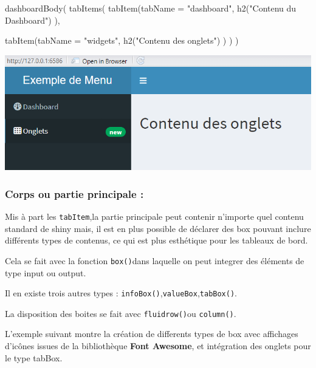 \documentclass[
]{article}
\newenvironment{Shaded}{\begin{snugshade}}{\end{snugshade}}
\newcommand{\AttributeTok}[1]{\textcolor[rgb]{0.77,0.63,0.00}{#1}}
\newcommand{\FunctionTok}[1]{\textcolor[rgb]{0.00,0.00,0.00}{#1}}
\newcommand{\NormalTok}[1]{#1}
\newcommand{\StringTok}[1]{\textcolor[rgb]{0.31,0.60,0.02}{#1}}
\begin{document}
\begin{Shaded}
\begin{Highlighting}[]
\FunctionTok{dashboardBody}\NormalTok{(}
  \FunctionTok{tabItems}\NormalTok{(}
    \FunctionTok{tabItem}\NormalTok{(}\AttributeTok{tabName =} \StringTok{"dashboard"}\NormalTok{,}
      \FunctionTok{h2}\NormalTok{(}\StringTok{"Contenu du Dashboard"}\NormalTok{)}
\NormalTok{    ),}

    \FunctionTok{tabItem}\NormalTok{(}\AttributeTok{tabName =} \StringTok{"widgets"}\NormalTok{,}
      \FunctionTok{h2}\NormalTok{(}\StringTok{"Contenu des onglets"}\NormalTok{)}
\NormalTok{    )}
\NormalTok{  )}
\NormalTok{)}
\end{Highlighting}
\end{Shaded}

\includegraphics{images/clipboard-4165437791.png}

\hypertarget{corps-ou-partie-principale}{%
\subsubsection{Corps ou partie principale
:}\label{corps-ou-partie-principale}}

Mis à part les \texttt{tabItem},la partie principale peut contenir
n'importe quel contenu standard de shiny mais, il est en plus possible
de déclarer des box pouvant inclure différents types de contenus, ce qui
est plus esthétique pour les tableaux de bord.

Cela se fait avec la fonction \texttt{box()}dans laquelle on peut
integrer des éléments de type input ou output.

Il en existe trois autres types :
\texttt{infoBox()},\texttt{valueBox},\texttt{tabBox()}.

La disposition des boites se fait avec \texttt{fluidrow()}ou
\texttt{column()}.

L'exemple suivant montre la création de differents types de box avec
affichages d'icônes issues de la bibliothèque \textbf{Font Awesome}, et
intégration des onglets pour le type tabBox.
\end{document}
